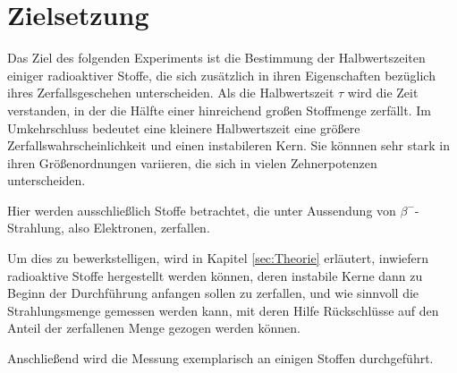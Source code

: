 \section{Zielsetzung}
\label{sec:Zielsetzung}

Das Ziel des folgenden Experiments ist die Bestimmung der Halbwertszeiten einiger radioaktiver Stoffe, die sich zusätzlich 
in ihren Eigenschaften bezüglich ihres Zerfallsgeschehen unterscheiden. 
Als die Halbwertszeit $\tau$ wird die Zeit verstanden, in der die Hälfte einer hinreichend großen Stoffmenge zerfällt. 
Im Umkehrschluss bedeutet eine kleinere Halbwertszeit eine größere Zerfallswahrscheinlichkeit und einen instabileren Kern. 
Sie könnnen sehr stark in ihren Größenordnungen variieren, die sich in vielen Zehnerpotenzen unterscheiden. 

Hier werden ausschließlich Stoffe betrachtet, die unter Aussendung von $\beta ^-$-Strahlung, also Elektronen, zerfallen. 

Um dies zu bewerkstelligen, wird in Kapitel \ref{sec:Theorie} erläutert, inwiefern radioaktive Stoffe hergestellt werden können, 
deren instabile Kerne dann zu Beginn der Durchführung anfangen sollen zu zerfallen, und wie sinnvoll die Strahlungsmenge gemessen werden kann, mit deren Hilfe Rückschlüsse 
auf den Anteil der zerfallenen Menge gezogen werden können. 

Anschließend wird die Messung exemplarisch an einigen Stoffen durchgeführt. 